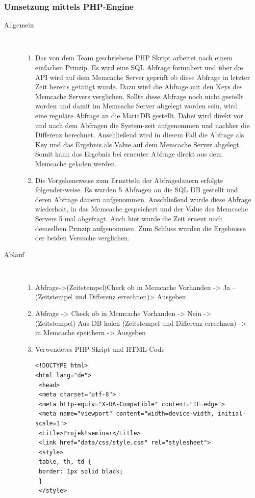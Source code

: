\documentclass[a4paper, 12pt]{scrartcl}
\begin{document}
\subsubsection{Umsetzung mittels PHP-Engine}
\begin{description}
   \item[Allgemein]~\par
   \begin{enumerate}
   		\item Das von dem Team geschriebene PHP Skript arbeitet nach einem einfachen Prinzip. Es wird eine SQL Abfrage formuliert und über die API wird auf dem Memcache Server geprüft ob diese Abfrage in letzter Zeit bereits getätigt wurde. Dazu wird die Abfrage mit den Keys des Memcache Servers verglichen. Sollte diese Abfrage noch nicht gestellt worden und damit im Memcache Server abgelegt worden sein, wird eine reguläre Abfrage an die MariaDB gestellt. Dabei wird direkt vor und nach dem Abfragen die System-zeit aufgenommen und nachher die Differenz berechnet. Anschließend wird in diesem Fall die Abfrage als Key und das Ergebnis als Value auf dem Memcache Server abgelegt. Somit kann das Ergebnis bei erneuter Abfrage direkt aus dem Memcache geladen werden.
   		\item Die Vorgehensweise zum Ermitteln der Abfragedauern erfolgte folgender-weise. Es wurden 5 Abfragen an die SQL DB gestellt und deren Abfrage dauern aufgenommen. Anschließend wurde diese Abfrage wiederholt, in das Memcache gespeichert und der Value des Memcache Servers 5 mal abgefragt. Auch hier wurde die Zeit erneut nach demselben Prinzip aufgenommen. Zum Schluss wurden die Ergebnisse der beiden Versuche verglichen.


   \end{enumerate}
   \newpage
   \item[Ablauf]~\par 
   \begin{enumerate}
   		\item Abfrage->(Zeitstempel)Check ob in Memcache Vorhanden -> Ja –(Zeitstempel und Differenz errechnen)> Ausgeben
   		\item Abfrage -> Check ob in Memcache Vorhanden -> Nein ->(Zeitstempel) Aus DB holen (Zeitstempel und Differenz errechnen) -> in Memcache speichern -> Ausgeben
   		\item Verwendetes PHP-Skript und HTML-Code
   		\begin{verbatim}
<!DOCTYPE html>
<html lang="de">
 <head>
 <meta charset="utf-8">
 <meta http-equiv="X-UA-Compatible" content="IE=edge">
 <meta name="viewport" content="width=device-width, initial-scale=1">
 <title>Projektseminar</title>
 <link href="data/css/style.css" rel="stylesheet">
 <style>
 table, th, td {
 border: 1px solid black;
 }
 </style>
 

\end{verbatim}
\end{enumerate}
\end{description}
\end{document}
